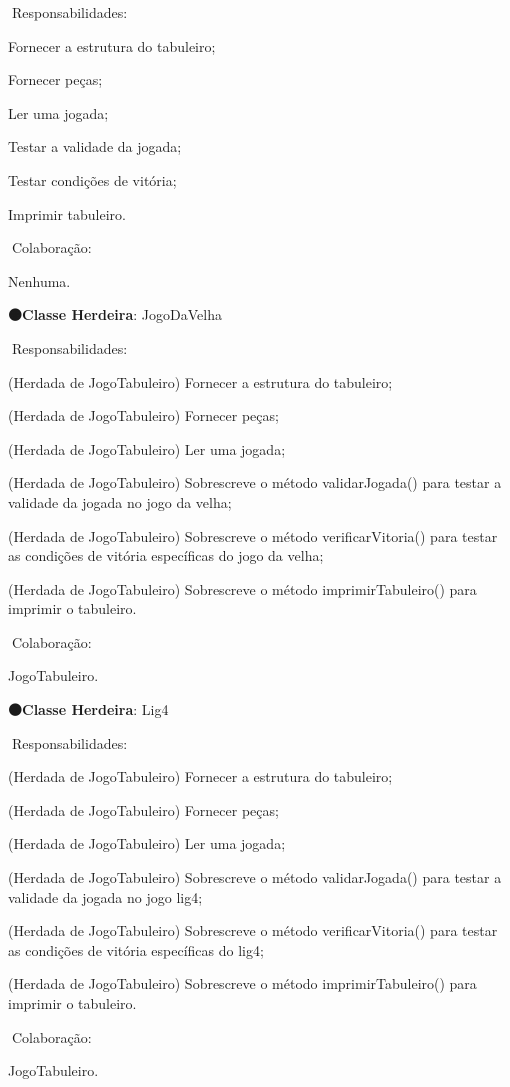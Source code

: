 🧐\+Responsabilidades\+:

Fornecer a estrutura do tabuleiro;

Fornecer peças;

Ler uma jogada;

Testar a validade da jogada;

Testar condições de vitória;

Imprimir tabuleiro.

🤝\+Colaboração\+:

Nenhuma.

{\bfseries 🟠\+Classe Herdeira}\+: Jogo\+Da\+Velha

🧐\+Responsabilidades\+:

(Herdada de Jogo\+Tabuleiro) Fornecer a estrutura do tabuleiro;

(Herdada de Jogo\+Tabuleiro) Fornecer peças;

(Herdada de Jogo\+Tabuleiro) Ler uma jogada;

(Herdada de Jogo\+Tabuleiro) Sobrescreve o método validar\+Jogada() para testar a validade da jogada no jogo da velha;

(Herdada de Jogo\+Tabuleiro) Sobrescreve o método verificar\+Vitoria() para testar as condições de vitória específicas do jogo da velha;

(Herdada de Jogo\+Tabuleiro) Sobrescreve o método imprimir\+Tabuleiro() para imprimir o tabuleiro.\+ 

🤝\+Colaboração\+:

Jogo\+Tabuleiro.

{\bfseries 🟠\+Classe Herdeira}\+: Lig4

🧐\+Responsabilidades\+:

(Herdada de Jogo\+Tabuleiro) Fornecer a estrutura do tabuleiro;

(Herdada de Jogo\+Tabuleiro) Fornecer peças;

(Herdada de Jogo\+Tabuleiro) Ler uma jogada;

(Herdada de Jogo\+Tabuleiro) Sobrescreve o método validar\+Jogada() para testar a validade da jogada no jogo lig4;

(Herdada de Jogo\+Tabuleiro) Sobrescreve o método verificar\+Vitoria() para testar as condições de vitória específicas do lig4;

(Herdada de Jogo\+Tabuleiro) Sobrescreve o método imprimir\+Tabuleiro() para imprimir o tabuleiro.\+ 

🤝\+Colaboração\+:

Jogo\+Tabuleiro.

